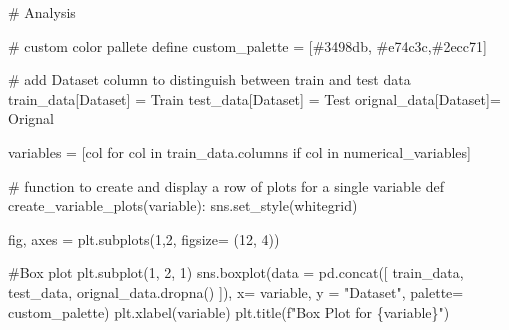 \documentclass[
  letterpaper,
  DIV=11,
  numbers=noendperiod]{scrartcl}
\newenvironment{Shaded}{\begin{snugshade}}{\end{snugshade}}
\newcommand{\CommentTok}[1]{\textcolor[rgb]{0.37,0.37,0.37}{#1}}
\newcommand{\ControlFlowTok}[1]{\textcolor[rgb]{0.00,0.23,0.31}{#1}}
\newcommand{\DecValTok}[1]{\textcolor[rgb]{0.68,0.00,0.00}{#1}}
\newcommand{\KeywordTok}[1]{\textcolor[rgb]{0.00,0.23,0.31}{#1}}
\newcommand{\NormalTok}[1]{\textcolor[rgb]{0.00,0.23,0.31}{#1}}
\newcommand{\OperatorTok}[1]{\textcolor[rgb]{0.37,0.37,0.37}{#1}}
\newcommand{\SpecialCharTok}[1]{\textcolor[rgb]{0.37,0.37,0.37}{#1}}
\newcommand{\SpecialStringTok}[1]{\textcolor[rgb]{0.13,0.47,0.30}{#1}}
\newcommand{\StringTok}[1]{\textcolor[rgb]{0.13,0.47,0.30}{#1}}
\begin{document}
\begin{Shaded}
\begin{Highlighting}[]
\CommentTok{\# Analysis}

\CommentTok{\# custom color pallete define}
\NormalTok{custom\_palette }\OperatorTok{=}\NormalTok{ [}\StringTok{\textquotesingle{}\#3498db\textquotesingle{}}\NormalTok{, }\StringTok{\textquotesingle{}\#e74c3c\textquotesingle{}}\NormalTok{,}\StringTok{\textquotesingle{}\#2ecc71\textquotesingle{}}\NormalTok{]}

\CommentTok{\# add \textquotesingle{}Dataset\textquotesingle{} column to distinguish between train and test data}
\NormalTok{train\_data[}\StringTok{\textquotesingle{}Dataset\textquotesingle{}}\NormalTok{] }\OperatorTok{=} \StringTok{\textquotesingle{}Train\textquotesingle{}}
\NormalTok{test\_data[}\StringTok{\textquotesingle{}Dataset\textquotesingle{}}\NormalTok{] }\OperatorTok{=} \StringTok{\textquotesingle{}Test\textquotesingle{}}
\NormalTok{orignal\_data[}\StringTok{\textquotesingle{}Dataset\textquotesingle{}}\NormalTok{]}\OperatorTok{=} \StringTok{\textquotesingle{}Orignal\textquotesingle{}}

\NormalTok{variables }\OperatorTok{=}\NormalTok{ [col }\ControlFlowTok{for}\NormalTok{ col }\KeywordTok{in}\NormalTok{ train\_data.columns }\ControlFlowTok{if}\NormalTok{ col }\KeywordTok{in}\NormalTok{ numerical\_variables]}

\CommentTok{\# function to create and display a row of plots for a single variable}
\KeywordTok{def}\NormalTok{ create\_variable\_plots(variable):}
\NormalTok{    sns.set\_style(}\StringTok{\textquotesingle{}whitegrid\textquotesingle{}}\NormalTok{)}
    
\NormalTok{    fig, axes }\OperatorTok{=}\NormalTok{ plt.subplots(}\DecValTok{1}\NormalTok{,}\DecValTok{2}\NormalTok{, figsize}\OperatorTok{=}\NormalTok{ (}\DecValTok{12}\NormalTok{, }\DecValTok{4}\NormalTok{))}
    
    \CommentTok{\#Box plot}
\NormalTok{    plt.subplot(}\DecValTok{1}\NormalTok{, }\DecValTok{2}\NormalTok{, }\DecValTok{1}\NormalTok{)}
\NormalTok{    sns.boxplot(data }\OperatorTok{=}\NormalTok{ pd.concat([}
\NormalTok{        train\_data, test\_data, orignal\_data.dropna()}
\NormalTok{    ]), }
\NormalTok{    x}\OperatorTok{=}\NormalTok{ variable, y }\OperatorTok{=} \StringTok{"Dataset"}\NormalTok{, palette}\OperatorTok{=}\NormalTok{ custom\_palette)}
\NormalTok{    plt.xlabel(variable)}
\NormalTok{    plt.title(}\SpecialStringTok{f"Box Plot for }\SpecialCharTok{\{}\NormalTok{variable}\SpecialCharTok{\}}\SpecialStringTok{"}\NormalTok{)}
    

\end{Highlighting}
\end{Shaded}
\end{document}
